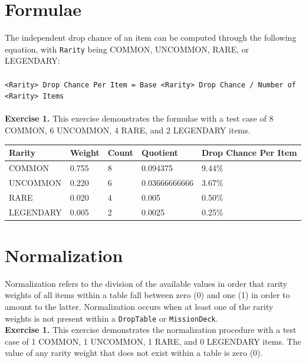 \documentclass[12pt]{article}
\begin{document}
\section{Formulae}

The independent drop chance of an item can be computed through the following equation, with \texttt{Rarity} being COMMON, UNCOMMON, RARE, or LEGENDARY: \\ \\ 

\texttt{<Rarity> Drop Chance Per Item = Base <Rarity> Drop Chance / Number of <Rarity> Items} \\ \\

\textbf{Exercise 1.} This exercise demonstrates the formulae with a test case of 8 COMMON, 6 UNCOMMON, 4 RARE, and 2 LEGENDARY items.

\begin{center}
	\begin{tabular}{|l||l|l|l|l|}
		\hline
		Rarity    & Weight & Count & Quotient      & Drop Chance Per Item \\
		\hline
		COMMON    & 0.755  & 8     & 0.094375      & 9.44\%               \\
		UNCOMMON  & 0.220  & 6     & 0.03666666666 & 3.67\%               \\
		RARE      & 0.020  & 4     & 0.005         & 0.50\%               \\
		LEGENDARY & 0.005  & 2     & 0.0025        & 0.25\%               \\ 
		\hline
	\end{tabular}
\end{center}

\section{Normalization}

Normalization refers to the division of the available values in order that rarity weights of all items within a table fall between zero (0) and one (1) in order to amount to the latter. Normalization occurs when at least one of the rarity weights is not present within a \texttt{DropTable} or \texttt{MissionDeck}. \\

\textbf{Exercise 1.} This exercise demonstrates the normalization procedure with a test case of 1 COMMON, 1 UNCOMMON, 1 RARE, and 0 LEGENDARY items. The value of any rarity weight that does not exist within a table is zero (0).
\end{document}
